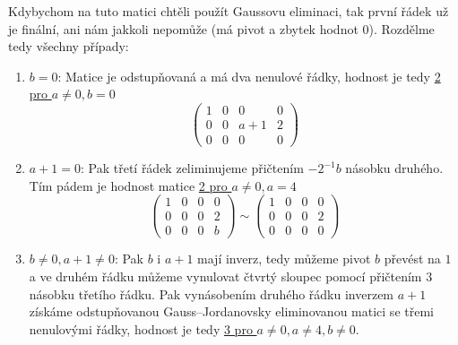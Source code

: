 \documentclass[12pt]{article}
\begin{document}
\begin{enumerate}
\begin{enumerate}
        Kdybychom na tuto matici chtěli použít Gaussovu eliminaci, tak první řádek už je finální,
        ani nám jakkoli nepomůže (má pivot a zbytek hodnot 0).
        Rozdělme tedy všechny případy:
        \begin{enumerate}
          \item $b=0$: Matice je odstupňovaná a má dva nenulové řádky, hodnost je tedy \underline{2 pro $a\neq0, b=0$}
            \[
              \left( \begin{array}{cccc}
                1 & 0 & 0 & 0 \\
                0 & 0 & a+1 & 2 \\
                0 & 0 & 0 & 0
              \end{array} \right)
            \]
          \item $a+1=0$: Pak třetí řádek zeliminujeme přičtením $-2^{-1}b$ násobku druhého. Tím pádem je hodnost matice
            \underline{2 pro $a\neq0,a=4$}
            \[
              \left( \begin{array}{cccc}
                1 & 0 & 0 & 0 \\
                0 & 0 & 0 & 2 \\
                0 & 0 & 0 & b
              \end{array} \right) \sim \left( \begin{array}{cccc}
                1 & 0 & 0 & 0 \\
                0 & 0 & 0 & 2 \\
                0 & 0 & 0 & 0
              \end{array} \right)
            \]
          \item $b\neq0,a+1\neq0$: Pak $b$ i $a+1$ mají inverz, tedy můžeme pivot $b$ převést na $1$ a ve druhém řádku můžeme vynulovat čtvrtý sloupec pomocí
            přičtením $3$ násobku třetího řádku. Pak vynásobením druhého řádku inverzem $a+1$ získáme odstupňovanou Gauss--Jordanovsky eliminovanou matici se třemi nenulovými řádky,
            hodnost je tedy \underline{3 pro $a\neq0, a\neq4, b\neq0$}.


\end{enumerate}
\end{enumerate}
\end{enumerate}
\end{document}
